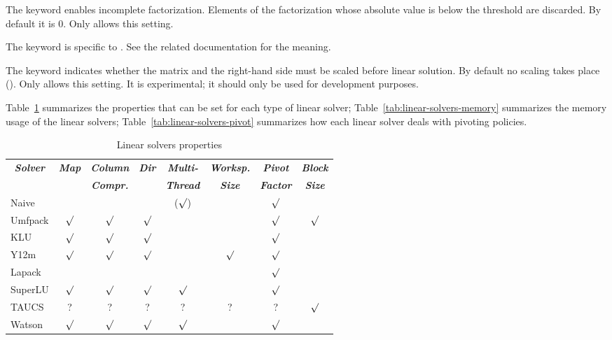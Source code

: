 The keyword  enables incomplete factorization.
Elements of the factorization whose absolute value is below
the  threshold are discarded.
By default it is 0.
Only  allows this setting.

The keyword  is specific to .
See the related documentation for the meaning.

The keyword  indicates whether the matrix and the right-hand side
must be scaled before linear solution.
By default no scaling takes place ().
Only  allows this setting.
It is experimental; it should only be used for development purposes.

Table~\ref{tab:linear-solvers-props} summarizes the properties that can be set
for each type of linear solver; Table~\ref{tab:linear-solvers-memory}
summarizes  the memory usage of the linear solvers;
Table~\ref{tab:linear-solvers-pivot}
summarizes how each linear solver deals with pivoting policies.

\begin{table}
\centering
\caption{Linear solvers properties}\label{tab:linear-solvers-props}
\begin{tabular}{lccccccc}
\hline
	\multicolumn{1}{c}{\textbf{\emph{Solver}}} &
	\multicolumn{1}{c}{\textbf{\emph{Map}}} &
	\multicolumn{1}{c}{\textbf{\emph{Column}}} &
	\multicolumn{1}{c}{\textbf{\emph{Dir}}} &
	\multicolumn{1}{c}{\textbf{\emph{Multi-}}} &
	\multicolumn{1}{c}{\textbf{\emph{Worksp.}}} &
	\multicolumn{1}{c}{\textbf{\emph{Pivot}}} &
	\multicolumn{1}{c}{\textbf{\emph{Block}}} \\
	& & \multicolumn{1}{c}{\textbf{\emph{Compr.}}} &
	& \multicolumn{1}{c}{\textbf{\emph{Thread}}}
	& \multicolumn{1}{c}{\textbf{\emph{Size}}}
	& \multicolumn{1}{c}{\textbf{\emph{Factor}}}
	& \multicolumn{1}{c}{\textbf{\emph{Size}}} \\
\hline\hline
	Naive		&         &         &         & ($\surd$) &         & $\surd$ &	        \\
	Umfpack		& $\surd$ & $\surd$ & $\surd$ &           &         & $\surd$ & $\surd$ \\
	KLU		& $\surd$ & $\surd$ & $\surd$ &           &         & $\surd$ &	        \\
	Y12m		& $\surd$ & $\surd$ & $\surd$ &	          & $\surd$ & $\surd$ &	        \\
	Lapack		&         &         &         &           &         & $\surd$ &         \\
	SuperLU		& $\surd$ & $\surd$ & $\surd$ & $\surd$   &         & $\surd$ &	        \\
	TAUCS		& ?       & ?       & ?       & ?         & ?       & ?       & $\surd$ \\
	Watson		& $\surd$ & $\surd$ & $\surd$ & $\surd$   &         & $\surd$ &	        \\
\hline
\end{tabular}
\end{table}

